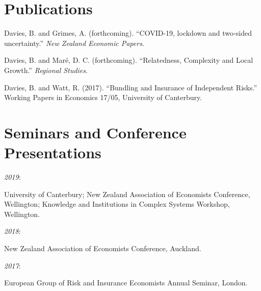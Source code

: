 \documentclass[11pt,oneside]{memoir}
\newcommand{\entry}[1]{\par\hangindent=0.4in #1}
\begin{document}
	\section{Publications}
	
		\entry{Davies, B. and Grimes, A. (forthcoming). ``COVID-19, lockdown and two-sided uncertainty.'' \emph{New Zealand Economic Papers}.}
		\entry{Davies, B. and Maré, D. C. (forthcoming). ``Relatedness, Complexity and Local Growth.'' \emph{Regional Studies}.}
		\entry{Davies, B. and Watt, R. (2017). ``Bundling and Insurance of Independent Risks.'' Working Papers in Economics 17/05, University of Canterbury.}
	
	\section{Seminars and Conference Presentations}
	
		\entry{\parbox[b]{0.4in}{\emph{2019}: }University of Canterbury; New Zealand Association of Economists Conference, Wellington; Knowledge and Institutions in Complex Systems Workshop, Wellington.}
		\entry{\parbox[b]{0.4in}{\emph{2018}: }New Zealand Association of Economists Conference, Auckland.}
		\entry{\parbox[b]{0.4in}{\emph{2017}: }European Group of Risk and Insurance Economists Annual Seminar, London.}
\end{document}
